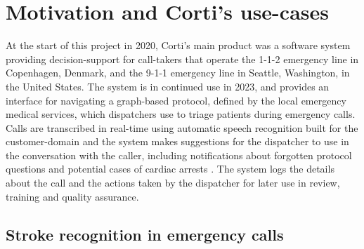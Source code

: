 \section{Motivation and Corti's use-cases}
%
%
At the start of this project in 2020, Corti's main product was a software system providing decision-support for call-takers that operate the 1-1-2 emergency line in Copenhagen, Denmark, and the 9-1-1 emergency line in Seattle, Washington, in the United States.
The system is in continued use in 2023, and provides an interface for navigating a graph-based protocol, defined by the local emergency medical services, which dispatchers use to triage patients during emergency calls. 
Calls are transcribed in real-time using automatic speech recognition built for the customer-domain and the system makes suggestions for the dispatcher to use in the conversation with the caller, including notifications about forgotten protocol questions \parencite{havtorn_multiqt_2020} and potential cases of cardiac arrests \parencite{cite15, cite14}. The system logs the details about the call and the actions taken by the dispatcher for later use in review, training and quality assurance. 


\subsection{Stroke recognition in emergency calls} \label{subsec:motivation-stroke-recognition}
%
